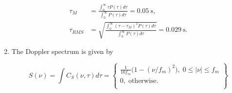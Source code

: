 \documentclass [a4paper, 11pt] {article}
\begin{document}
\begin{solution}
\begin{enumerate}
            \begin{align}
                \tau_M &= \frac{\int_0^\infty \tau P(\tau) d\tau}{\int_0^\infty P(\tau) d\tau} = \SI{0.05}{\second}, \\
                \tau_{RMS} & = \sqrt{\frac{\int_0^\infty (\tau - \tau_M)^2 P(\tau) d\tau}{\int_0^\infty P(\tau) d\tau}} = \SI{0.029}{\second}.
            \end{align}

            \item The Doppler spectrum is given by

            \[
            S(\nu) = \int C_S(\nu, \tau) d\tau = \left\{
                        \begin{array}{ll}
                         \frac{1}{10 f_m}\big(1-(\nu/f_m)^2\big), \; 0 \leq |\nu| \leq f_m\\
                          0, \; \text{otherwise}. \\
                        \end{array}
                        \right\}
            \]
        \end{enumerate}
   \end{solution}
\end{document}

